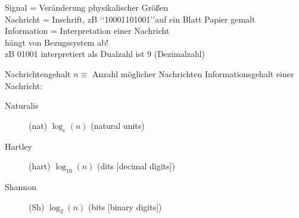 \begin{frame}
	Signal = Veränderung physikalischer Größen\\
	Nachricht =  Inschrift, zB \lq\lq{10001101001}\rq\rq auf ein Blatt Papier gemalt\\
	Information = Interpretation einer Nachricht\\
	hängt von Bezugssystem ab!\\
	zB 01001 interpretiert als Dualzahl ist 9 (Dezimalzahl)
\end{frame}

\begin{frame}{Nachrichtengehalt}
	$n \equiv$ Anzahl möglicher Nachrichten
	Informationsgehalt einer Nachricht:
	\begin{description}
		\item[Naturalis](nat) $\log_e(n)$  (natural units)
		\item[Hartley] (hart) $\log_{10}(n)$ (dits [decimal digits])
		\item[Shannon] (Sh) $\log_2(n)$ (bits [binary digits])
	\end{description}
\end{frame}
